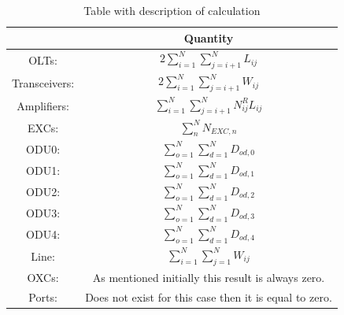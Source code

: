 \begin{table}[h!]
\centering
\begin{tabular}{|| c | c ||}
 \hline
  & Quantity \\ \hline
 OLTs: & \(\displaystyle 2 \sum_{i=1}^{N}\sum_{j=i+1}^{N} L_{ij} \) \\ \hline
 Transceivers: & \(\displaystyle 2 \sum_{i=1}^{N}\sum_{j=i+1}^{N} W_{ij} \) \\ \hline
 Amplifiers: & \(\displaystyle \sum_{i=1}^{N}\sum_{j=i+1}^{N} N^R_{ij} L_{ij} \) \\ \hline
 EXCs: & \(\displaystyle \sum_n^N N_{EXC,n} \) \\ \hline
 ODU0: & \(\displaystyle \sum_{o=1}^{N}\sum_{d=1}^{N} D_{od,0} \) \\ \hline
 ODU1: & \(\displaystyle \sum_{o=1}^{N}\sum_{d=1}^{N} D_{od,1} \) \\ \hline
 ODU2: & \(\displaystyle \sum_{o=1}^{N}\sum_{d=1}^{N} D_{od,2} \)\\ \hline
 ODU3: & \(\displaystyle \sum_{o=1}^{N}\sum_{d=1}^{N} D_{od,3} \) \\ \hline
 ODU4: & \(\displaystyle \sum_{o=1}^{N}\sum_{d=1}^{N} D_{od,4} \) \\ \hline
 Line: & \(\displaystyle \sum_{i=1}^{N}\sum_{j=1}^{N} W_{ij} \) \\ \hline
 OXCs: & As mentioned initially this result is always zero. \\ \hline
 Ports: & Does not exist for this case then it is equal to zero. \\
 \hline
 \end{tabular}
\caption{Table with description of calculation}
\label{formulas_opaque_surv_ref_low}
\end{table}

